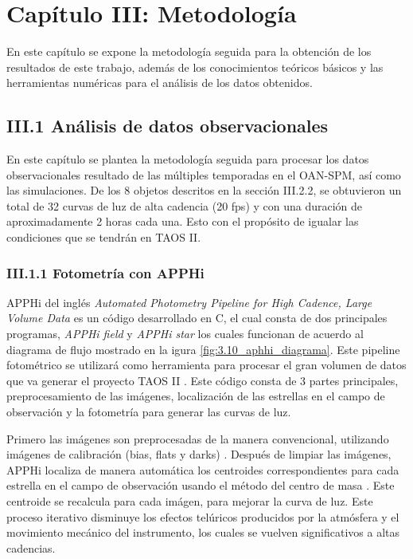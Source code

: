 \chapter*{\textbf{Capítulo III: Metodología}}
\label{ch:Metodologia}
\setcounter{chapter}{3}
\setcounter{equation}{0}
\setcounter{figure}{0}
\setcounter{table}{0}

En este capítulo se expone la metodología seguida para la obtención de los resultados de este trabajo, adem\'as de los conocimientos teóricos básicos y las herramientas numéricas para el análisis de los datos obtenidos.

\section*{III.1 Análisis de datos observacionales}

En este capítulo se plantea la metodología seguida para procesar los datos observacionales resultado de las múltiples temporadas en el OAN-SPM, así como las simulaciones. De los 8 objetos descritos en la sección III.2.2, se obtuvieron un total de 32 curvas de luz de alta cadencia (20 fps) y con una duración de aproximadamente 2 horas cada una. Esto con el propósito de igualar las condiciones que se tendrán en TAOS II.

\subsection*{III.1.1 Fotometría con APPHi}

APPHi del inglés \textit{Automated Photometry Pipeline for High Cadence, Large Volume Data} es un código desarrollado en C, el cual consta de dos principales programas, \textit{APPHi field} y \textit{APPHi star} los cuales funcionan de acuerdo al diagrama de flujo mostrado en la igura \ref{fig:3.10_aphhi_diagrama}.  Este pipeline fotométrico se utilizará como herramienta para procesar el gran volumen de datos que va generar el proyecto TAOS II \cite{lehner2016status}. Este código consta de 3 partes principales, preprocesamiento de las imágenes, localización de las estrellas en el campo de observación y la fotometría para generar las curvas de luz.

Primero las imágenes son preprocesadas de la manera convencional, utilizando imágenes de calibración (bias, flats y darks) \cite{romanishin2006introduction}. Después de limpiar las imágenes, APPHi localiza de manera automática los centroides correspondientes para cada estrella en el campo de observación usando el método del centro de masa \cite{chong2004introduction}. Este centroide se recalcula para cada imágen, para mejorar la curva de luz. Este proceso iterativo disminuye los efectos telúricos producidos por la atmósfera y el movimiento mecánico del instrumento, los cuales se vuelven significativos a altas cadencias. 

